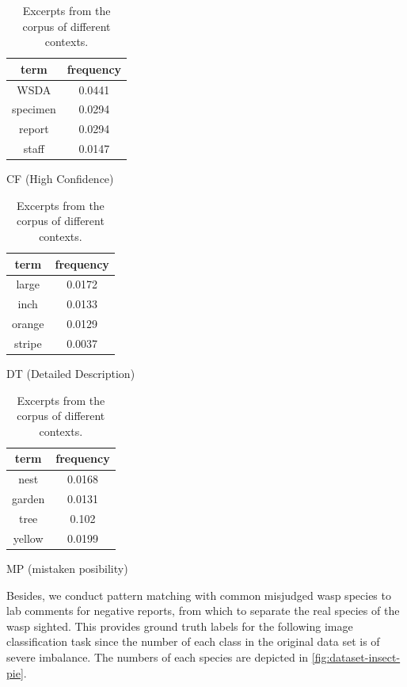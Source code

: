 \documentclass{mcmthesis}
\begin{document}
\begin{table}[htbp]
    \centering
    \begin{subtable}{0.3\textwidth}
        \centering
        \begin{tabular}{cc}
            \toprule
            term & frequency \\
            \midrule
            WSDA & 0.0441 \\
            specimen & 0.0294 \\
            report & 0.0294 \\
            staff & 0.0147 \\
            \bottomrule
        \end{tabular}
        \caption{CF (High Confidence)}
        \label{subtab:cf}
    \end{subtable}
    \quad
    \begin{subtable}{0.3\textwidth}
        \centering
        \begin{tabular}{cc}
            \toprule
            term & frequency \\
            \midrule
            large & 0.0172 \\
            inch & 0.0133 \\
            orange & 0.0129 \\
            stripe & 0.0037 \\
            \bottomrule
        \end{tabular}
        \caption{DT (Detailed Description)}
        \label{subtab:dt}
    \end{subtable}
    \quad
    \begin{subtable}{0.3\textwidth}
        \centering
        \begin{tabular}{cc}
            \toprule
            term & frequency \\
            \midrule
            nest & 0.0168 \\
            garden & 0.0131 \\
            tree & 0.102 \\
            yellow & 0.0199 \\
            \bottomrule
        \end{tabular}
        \caption{MP (mistaken posibility)}
        \label{subtab:mp}
    \end{subtable}
    \caption{Excerpts from the corpus of different contexts.}
    \label{tab:test1}
\end{table}

Besides, we conduct pattern matching with common misjudged wasp species to lab comments for negative reports, from which to separate the real species of the wasp sighted. This provides ground truth labels for the following image classification task since the number of each class in the original data set is of severe imbalance. The numbers of each species are depicted in \autoref{fig:dataset-insect-pie}. 
\end{document}
